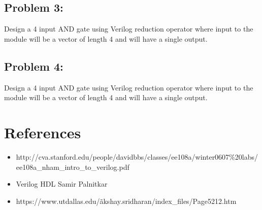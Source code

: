 \documentclass[a4paper,10pt]{article}
\theoremstyle{mytheor}
\begin{document}
\subsection*{Problem 3:}
Design a 4 input AND gate using Verilog reduction operator where input to the module will be a vector of length 4 and will have a single output.
\subsection*{Problem 4:}
Design a 4 input AND gate using Verilog reduction operator where input to the module will be a vector of length 4 and will have a single output.

\section*{References}
\begin{itemize}
  \item http://cva.stanford.edu/people/davidbbs/classes/ee108a/winter0607\%20labs/ee108a\_nham\_intro\_to\_verilog.pdf
  \item Verilog HDL \- Samir Palnitkar
  \item https://www.utdallas.edu/\~akshay.sridharan/index\_files/Page5212.htm
\end{itemize}
\end{document}
